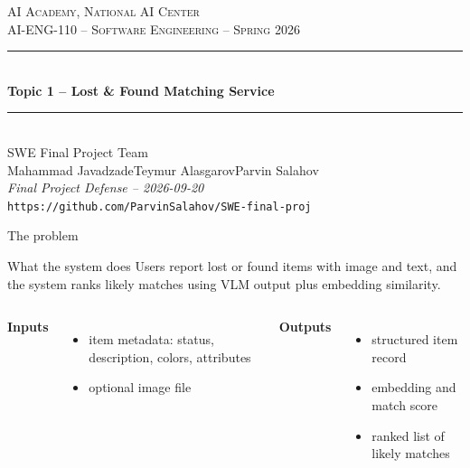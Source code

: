 \documentclass[aspectratio=169,11pt]{beamer}
\newcommand{\teamname}{SWE Final Project Team}
\newcommand{\topicchoice}{Topic 1 -- Lost \& Found Matching Service}
\newcommand{\memberone}{Mahammad Javadzade}
\newcommand{\membertwo}{Teymur Alasgarov}
\newcommand{\memberthree}{Parvin Salahov}
\newcommand{\repolink}{https://github.com/ParvinSalahov/SWE-final-proj}
\newcommand{\coursecode}{AI-ENG-110}
\newcommand{\coursename}{Software Engineering}
\newcommand{\institution}{AI Academy, National AI Center}
\newcommand{\semester}{Spring 2026}
\begin{document}
{%
\begin{frame}[plain]
  \begin{center}
    \vspace{0.6cm}
    {\small \textsc{\institution}}\\[0.2em]
    {\small \textsc{\coursecode{} -- \coursename{} -- \semester{}}}\\[1.2em]
    \rule{0.7\textwidth}{0.6pt}\\[0.4em]
    {\Huge\bfseries\color{accent} \topicchoice}\\[0.4em]
    \rule{0.7\textwidth}{0.6pt}\\[1.2em]
    {\large \teamname}\\[0.6em]
    {\normalsize \memberone\quad\textbullet\quad\membertwo\quad\textbullet\quad\memberthree}\\[1cm]
    {\footnotesize\itshape Final Project Defense -- 2026-09-20}\\[0.4em]
    {\footnotesize\texttt{\repolink}}
  \end{center}
\end{frame}
}

\begin{frame}{The problem}
  \begin{block}{What the system does}
    Users report lost or found items with image and text, and the system ranks likely matches using VLM output plus embedding similarity.
  \end{block}
  \begin{columns}[T,onlytextwidth]
  \textbf{Inputs}
  \begin{itemize}
    \item item metadata: status, description, colors, attributes
    \item optional image file
  \end{itemize}
  \textbf{Outputs}
  \begin{itemize}
    \item structured item record
    \item embedding and match score
    \item ranked list of likely matches
  \end{itemize}
  \end{columns}
\end{frame}
\end{document}
